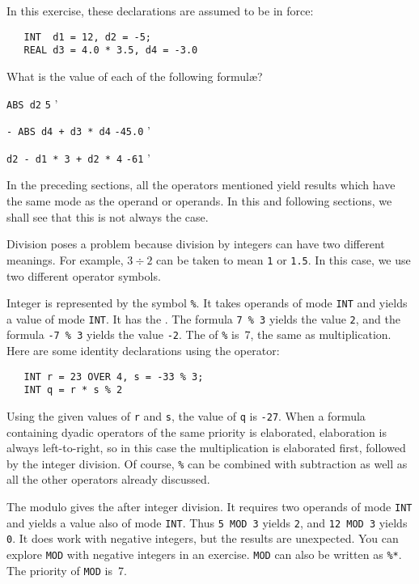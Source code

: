 \begin{exercise}
\item In this exercise, these declarations are assumed to be in force:
\begin{verbatim}
   INT  d1 = 12, d2 = -5;
   REAL d3 = 4.0 * 3.5, d4 = -3.0
\end{verbatim}
\noindent
What is the value of each of the following formul{\ae}?
\begin{subex}
\item \verb|ABS d2| \subans \verb|5|
'
\item \verb|- ABS d4 + d3 * d4| \subans \verb|-45.0|
'
\item \verb|d2 - d1 * 3 + d2 * 4| \subans \verb|-61|
'
\end{subex}
\end{exercise}

In the preceding sections, all the operators mentioned yield results
which have the same mode as the operand or operands. In this and
following sections, we shall see that this is not always the case.

Division poses a problem because division by integers can have two
different meanings.  For example, $3\div2$ can be taken to mean
\verb|1| or \verb|1.5|.  In this case, we use two different operator
symbols.

Integer  is represented by the
symbol \verb|%|.  It takes operands of mode \verb|INT| and yields a
value of mode \verb|INT|.  It has the 
.  The formula \texttt{7 \%\ 3} yields the value \verb|2|,
and the formula \texttt{-7 \%\ 3} yields the value \verb|-2|.  The
 of \verb|%| is~7, the same as multiplication.  Here
are some identity declarations using the operator:
\begin{verbatim}
   INT r = 23 OVER 4, s = -33 % 3;
   INT q = r * s % 2
\end{verbatim}
\noindent
Using the given values of \verb|r| and \verb|s|, the value of
\verb|q| is \verb|-27|. When a formula containing
 dyadic operators of the
same priority is elaborated, elaboration is always left-to-right, so
in this case the multiplication is elaborated first, followed by the
integer division.  Of course, \verb|%| can be combined with
subtraction as well as all the other operators already discussed.

The modulo   gives the
 after integer division. It requires two operands of
mode \verb|INT| and yields a value also of mode \verb|INT|. Thus
\verb|5 MOD 3| yields \verb|2|, and \verb|12 MOD 3| yields \verb|0|.
It does work with negative integers, but the results are unexpected.
You can explore \verb|MOD| with negative integers in an exercise.
\verb|MOD| can also be written as \verb|%*|. The priority of
\verb|MOD| is~7.

